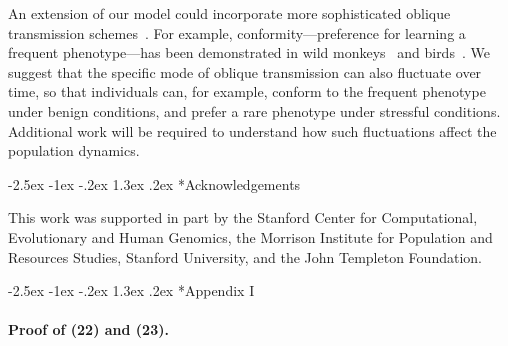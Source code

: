 \documentclass[14pt]{extarticle}
\makeatletter
\renewcommand\section{\@startsection {section}{1}{\z@}%
     {-2.5ex \@plus -1ex \@minus -.2ex}%
     {1.3ex \@plus.2ex}%
    {\Large\bfseries}}
\makeatother
\begin{document}
An extension of our model could incorporate more sophisticated oblique transmission schemes~\citep[][Figure~3]{Creanza2017}.
For example, conformity---preference for learning a frequent phenotype---has been demonstrated in wild monkeys~\citep{VanDeWaal2013} and birds~\citep{Aplin2015}.
We suggest that the specific mode of oblique transmission can also fluctuate over time, so that individuals can, for example, conform to the frequent phenotype under benign conditions, and prefer a rare phenotype under stressful conditions.
Additional work will be required to understand how such fluctuations affect the population dynamics. 

{\small
\section*{Acknowledgements}

This work was supported in part by 
the Stanford Center for Computational, Evolutionary and Human Genomics, 
the Morrison Institute for Population and Resources Studies, Stanford University, and the John Templeton Foundation.
}




\section*{Appendix I}
\paragraph{Proof of (22) and (23).}

\end{document}
